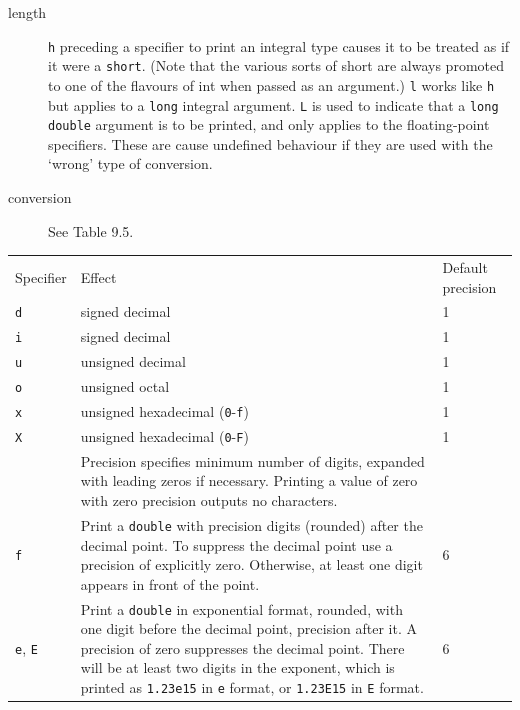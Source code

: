 \begin{description}
   \item[length] \texttt{h} preceding a specifier to print an integral type  causes
    it  to  be treated as if it were a \texttt{short}.  (Note that the
    various sorts of short are always promoted to one of  the flavours of int
    when passed as an argument.) \texttt{l} works like \texttt{h} but
    applies to a \texttt{long} integral argument.  \texttt{L} is used
    to indicate  that  a  \texttt{long double} argument is to be printed,
    and only applies to the floating-point specifiers.  These are  cause
    undefined behaviour if they are used with the `wrong' type of
    conversion.

   \item[conversion] See Table 9.5.
   \end{description}

   \begin{tabular}{llp{\textwidth}}
     Specifier & Effect & Default precision
    \\

     \texttt{d} & signed decimal & 1
    \\

     \texttt{i} & signed decimal & 1
    \\

     \texttt{u} & unsigned decimal & 1
    \\

     \texttt{o} & unsigned octal & 1
    \\

     \texttt{x} & unsigned hexadecimal (\texttt{0}-\texttt{f}) & 1
    \\

     \texttt{X} & unsigned hexadecimal (\texttt{0}-\texttt{F}) & 1
    \\

      & Precision specifies minimum number of digits, expanded
      with leading zeros if necessary.  Printing a value
      of zero with zero precision outputs no characters. & 
    \\

     \texttt{f} & Print a \texttt{double} with precision
      digits (rounded) after the decimal point.  To suppress
      the decimal point use a precision of explicitly zero.
      Otherwise, at least one digit appears in front of the point. & 6
    \\

     \texttt{e}, \texttt{E} & Print a \texttt{double} in exponential format, rounded, with one
      digit before the decimal point, precision after it.  A
      precision of zero suppresses the decimal point.  There will
      be at least two digits in the exponent, which is printed as
      \texttt{1.23e15} in \texttt{e} format, or \texttt{1.23E15}
      in \texttt{E} format. & 6
    \\


\end{tabular}
